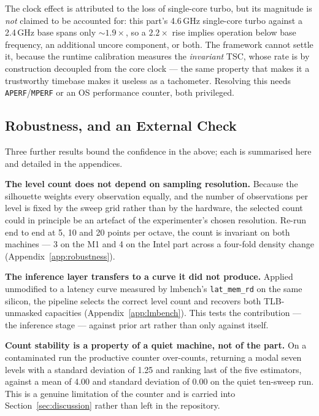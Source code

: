 \documentclass[conference]{IEEEtran}
\begin{document}
The clock effect is attributed to the loss of single-core turbo, but its
magnitude is \emph{not} claimed to be accounted for: this part's 4.6\,GHz
single-core turbo against a 2.4\,GHz base spans only ${\sim}1.9\times$, so a
$2.2\times$ rise implies operation below base frequency, an additional uncore
component, or both. The framework cannot settle it, because the runtime
calibration measures the \emph{invariant} TSC, whose rate is by construction
decoupled from the core clock --- the same property that makes it a trustworthy
timebase makes it useless as a tachometer. Resolving this needs
\texttt{APERF}/\texttt{MPERF} or an OS performance counter, both privileged.

\subsection{Robustness, and an External Check}

Three further results bound the confidence in the above; each is summarised here
and detailed in the appendices.

\textbf{The level count does not depend on sampling resolution.} Because the
silhouette weights every observation equally, and the number of observations per
level is fixed by the sweep grid rather than by the hardware, the selected count
could in principle be an artefact of the experimenter's chosen resolution. Re-run
end to end at 5, 10 and 20 points per octave, the count is invariant on both
machines --- 3 on the M1 and 4 on the Intel part across a four-fold density
change (Appendix~\ref{app:robustness}).

\textbf{The inference layer transfers to a curve it did not produce.} Applied
unmodified to a latency curve measured by lmbench's \texttt{lat\_mem\_rd}
\citep{mcvoy1996} on the same silicon, the pipeline selects the correct level
count and recovers both TLB-unmasked capacities (Appendix~\ref{app:lmbench}).
This tests the contribution --- the inference stage --- against prior art rather
than only against itself.

\textbf{Count stability is a property of a quiet machine, not of the part.} On a
contaminated run the productive counter over-counts, returning a modal seven
levels with a standard deviation of 1.25 and ranking last of the five estimators,
against a mean of 4.00 and standard deviation of 0.00 on the quiet ten-sweep run.
This is a genuine limitation of the counter and is carried into
Section~\ref{sec:discussion} rather than left in the repository.
\end{document}

